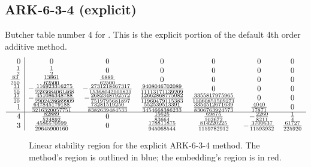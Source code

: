 \documentclass[letterpaper,10pt,english]{sphinxmanual}
\begin{document}
\subsection{ARK-6-3-4 (explicit)}
\label{Butcher:butcher-ark-6-3-4-e}\label{Butcher:ark-6-3-4-explicit}
Butcher table number 4
for {\hyperref[c_interface/User_callable:c.ARKodeSetERKTableNum]{\emph{}}}.  This is
the explicit portion of the default 4th order additive method.
\begin{gather}
\begin{split}\begin{array}{r|cccccc}
  0 & 0 & 0 & 0 & 0 & 0 & 0 \\
  \frac12 & \frac12 & 0 & 0 & 0 & 0 & 0 \\
  \frac{83}{250} & \frac{13861}{62500} & \frac{6889}{62500} & 0 & 0 & 0 & 0 \\
  \frac{31}{50} & -\frac{116923316275}{2393684061468} & -\frac{2731218467317}{15368042101831} & \frac{9408046702089}{11113171139209} & 0 & 0 & 0 \\
  \frac{17}{20} & -\frac{451086348788}{2902428689909} & -\frac{2682348792572}{7519795681897} & \frac{12662868775082}{11960479115383} & \frac{3355817975965}{11060851509271} & 0 & 0 \\
  1 & \frac{647845179188}{3216320057751} & \frac{73281519250}{8382639484533} & \frac{552539513391}{3454668386233} & \frac{3354512671639}{8306763924573} & \frac{4040}{17871} & 0 \\
  \hline
  4 & \frac{82889}{524892} & 0 & \frac{15625}{83664} & \frac{69875}{102672} & -\frac{2260}{8211} & \frac14 \\
  3 & \frac{4586570599}{29645900160} & 0 & \frac{178811875}{945068544} & \frac{814220225}{1159782912} & -\frac{3700637}{11593932} & \frac{61727}{225920}
\end{array}\end{split}\notag
\end{gather}\begin{figure}[htbp]
\centering
\capstart

\caption{Linear stability region for the explicit ARK-6-3-4 method.  The method's
region is outlined in blue; the embedding's region is in red.}\end{figure}
\end{document}
